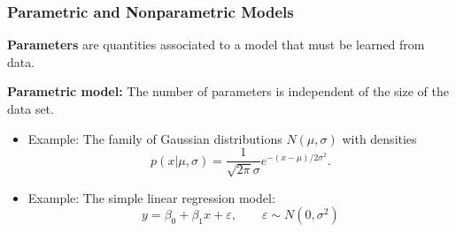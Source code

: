 \documentclass[xcolor={dvipsnames}]{beamer}
\renewcommand{\epsilon}{\varepsilon}
\begin{document}
    
        






    



\begin{frame}
    \frametitle{Parametric and Nonparametric Models}
    \setlength\parskip{0.75em}

    \textbf{Parameters} are quantities associated to a model that must be learned from data.

    \textbf{Parametric model:} The number of parameters is independent of the size of the data set.
    \begin{itemize}
        \item Example: The family of Gaussian distributions $N(\mu,\sigma)$ with densities
        \[
            p(x|\mu,\sigma) = \frac1{\sqrt{2\pi}\sigma}e^{-(x-\mu)/2\sigma^2}.
        \]
        \item Example: The simple linear regression model:
        \[
            y=\beta_0 + \beta_1x + \epsilon,\qquad \epsilon\sim N(0,\sigma^2)
        \]
    \end{itemize}
\end{frame} 
\end{document}
